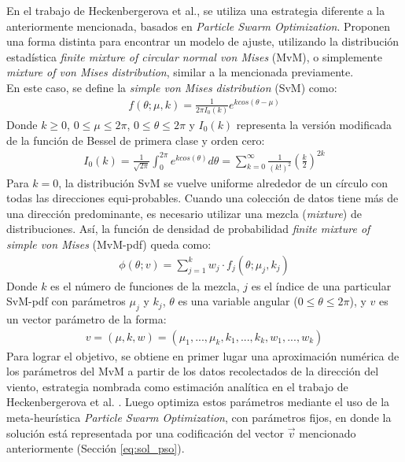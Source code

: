 En el trabajo de Heckenbergerova et al.\cite{Heckenbergerova15}, se utiliza una estrategia diferente a la anteriormente mencionada, basados en \emph{Particle Swarm Optimization}. Proponen una forma distinta para encontrar un modelo de ajuste, utilizando la distribución estadística \emph{finite mixture of circular normal von Mises} (MvM), o simplemente \emph{mixture of von Mises distribution}, similar a la mencionada previamente.\\ 
En este caso, se define la \emph{simple von Mises distribution} (SvM) como:
\begin{align}\label{eq:simpleVonMises}
    f(\theta; \mu, k) = \frac{1}{2{\pi}I_{0}(k)}e^{k cos(\theta - \mu)}
\end{align}    
Donde $k \geq 0$, $0 \leq \mu \leq 2\pi$, $0 \leq \theta \leq 2\pi$ y $I_0(k)$ representa la versión modificada de la función de Bessel de primera clase y orden cero:
\begin{align}
    I_0(k) = \frac{1}{\sqrt{2\pi}}\int_0^{2\pi} e^{k cos(\theta)} d\theta = \sum_{k=0}^{\infty} \frac{1}{(k!)^2}(\frac{k}{2})^{2k}
\end{align}    
Para $k=0$, la distribución SvM se vuelve uniforme alrededor de un círculo con todas las direcciones equi-probables. Cuando una colección de datos tiene más de una dirección predominante, es necesario utilizar una mezcla (\emph{mixture}) de distribuciones.
Así, la función de densidad de probabilidad \emph{finite mixture of simple von Mises} (MvM-pdf) queda como:
\begin{align}\label{eq:mixtureVonMises}
    \phi(\theta; v) = \sum_{j=1}^{k} w_j \cdot f_j(\theta; \mu_j, k_j)
\end{align}    
Donde $k$ es el número de funciones de la mezcla, $j$ es el índice de una particular SvM-pdf con parámetros $\mu_j$ y $k_j$, $\theta$ es una variable angular ($0 \leq \theta \leq 2\pi$), y $v$ es un vector parámetro de la forma:
 \begin{align}\label{eq:sol_pso}
    v = (\mu, k, w) = (\mu_1, ..., \mu_k,k_1,...,k_k,w_1,...,w_k)
\end{align}
Para lograr el objetivo, se obtiene en primer lugar una aproximación numérica de los parámetros del MvM a partir de los datos recolectados de la dirección del viento, estrategia nombrada como estimación analítica en el trabajo de Heckenbergerova et al. \cite{Heckenbergerova15}. Luego optimiza estos parámetros mediante el uso de la meta-heurística \emph{Particle Swarm Optimization}, con parámetros fijos, en donde la solución está representada por una codificación del vector $\vec{v}$ mencionado anteriormente (Sección \ref{eq:sol_pso}).\\ 
